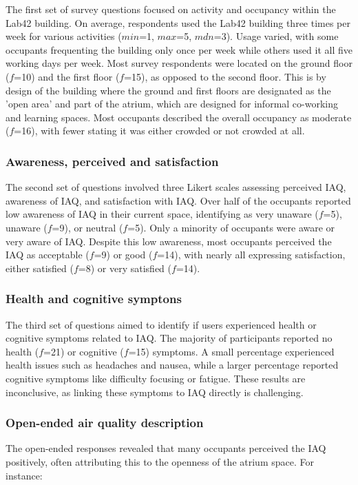 The first set of survey questions focused on activity and occupancy within the Lab42 building. On average, respondents used the Lab42 building three times per week for various activities ($min$=1, $max$=5, $mdn$=3). Usage varied, with some occupants frequenting the building only once per week while others used it all five working days per week. Most survey respondents were located on the ground floor ($f$=10) and the first floor ($f$=15), as opposed to the second floor. This is by design of the building where the ground and first floors are designated as the 'open area' and part of the atrium, which are designed for informal co-working and learning spaces. Most occupants described the overall occupancy as moderate ($f$=16), with fewer stating it was either crowded or not crowded at all.

\subsubsection{Awareness, perceived and satisfaction}

The second set of questions involved three Likert scales assessing perceived IAQ, awareness of IAQ, and satisfaction with IAQ. Over half of the occupants reported low awareness of IAQ in their current space, identifying as very unaware ($f$=5), unaware ($f$=9), or neutral ($f$=5). Only a minority of occupants were aware or very aware of IAQ. Despite this low awareness, most occupants perceived the IAQ as acceptable ($f$=9) or good ($f$=14), with nearly all expressing satisfaction, either satisfied ($f$=8) or very satisfied ($f$=14).


\subsubsection{Health and cognitive symptons}

The third set of questions aimed to identify if users experienced health or cognitive symptoms related to IAQ. The majority of participants reported no health ($f$=21) or cognitive ($f$=15) symptoms. A small percentage experienced health issues such as headaches and nausea, while a larger percentage reported cognitive symptoms like difficulty focusing or fatigue. These results are inconclusive, as linking these symptoms to IAQ directly is challenging.

\subsubsection{Open-ended air quality description}
The open-ended responses revealed that many occupants perceived the IAQ positively, often attributing this to the openness of the atrium space. For instance:

